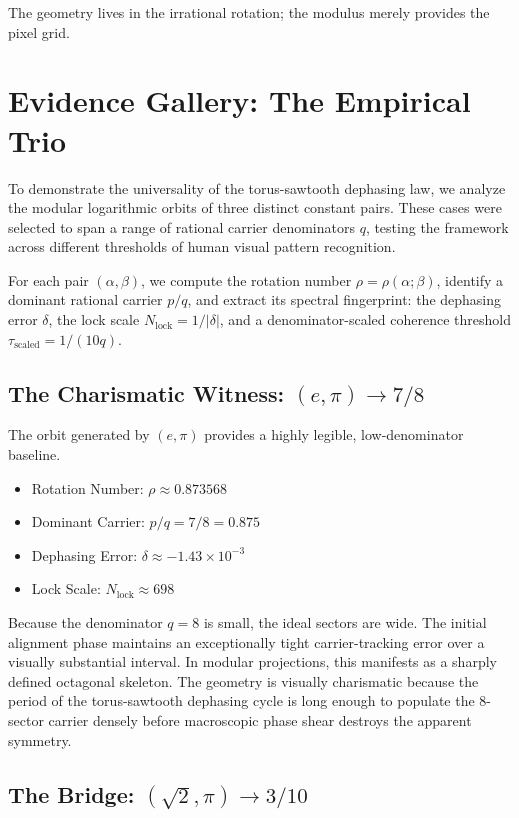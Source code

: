 \documentclass[11pt]{article}
\begin{document}
The geometry lives in the irrational rotation; the modulus merely provides the pixel grid.

\section{Evidence Gallery: The Empirical Trio}

To demonstrate the universality of the torus-sawtooth dephasing law, we analyze the modular logarithmic orbits of three distinct constant pairs. These cases were selected to span a range of rational carrier denominators $q$, testing the framework across different thresholds of human visual pattern recognition.

For each pair $(\alpha,\beta)$, we compute the rotation number $\rho=\rho(\alpha;\beta)$, identify a dominant rational carrier $p/q$, and extract its spectral fingerprint: the dephasing error $\delta$, the lock scale $N_{\mathrm{lock}}=1/|\delta|$, and a denominator-scaled coherence threshold $\tau_{\mathrm{scaled}}=1/(10q)$.

\subsection{The Charismatic Witness: $(e,\pi)\to 7/8$}

The orbit generated by $(e,\pi)$ provides a highly legible, low-denominator baseline.
\begin{itemize}
    \item Rotation Number: $\rho \approx 0.873568$
    \item Dominant Carrier: $p/q = 7/8 = 0.875$
    \item Dephasing Error: $\delta \approx -1.43\times 10^{-3}$
    \item Lock Scale: $N_{\mathrm{lock}} \approx 698$
\end{itemize}

Because the denominator $q=8$ is small, the ideal sectors are wide. The initial alignment phase maintains an exceptionally tight carrier-tracking error over a visually substantial interval. In modular projections, this manifests as a sharply defined octagonal skeleton. The geometry is visually charismatic because the period of the torus-sawtooth dephasing cycle is long enough to populate the 8-sector carrier densely before macroscopic phase shear destroys the apparent symmetry.

\subsection{The Bridge: $(\sqrt{2},\pi)\to 3/10$}
\end{document}
